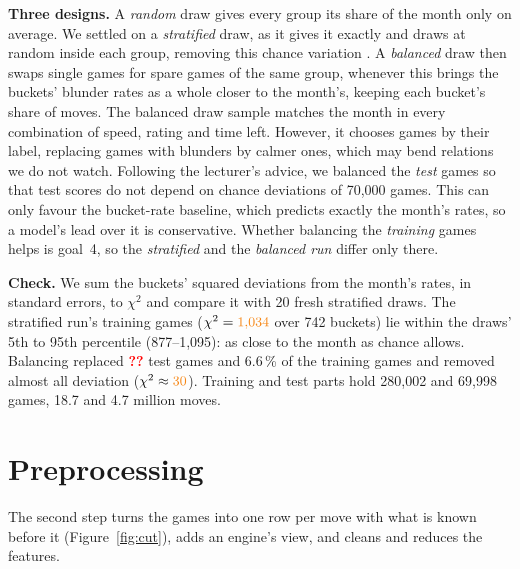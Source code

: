 \documentclass[a4paper,oneside,bibliography=totoc]{scrbook}
\newcommand{\tbd}{\textcolor{red}{\textbf{??}}}
\newcommand{\stale}[1]{\textcolor{BurntOrange}{#1}}
\begin{document}
\textbf{Three designs.} A \emph{random} draw gives every group its share of the month only on average. We settled on a
\emph{stratified} draw, as it gives it exactly and draws at random inside each group, removing this chance variation
\cite{cochran1977sampling}. A
\emph{balanced} draw then swaps single games for spare games of the same group, whenever this brings the buckets'
blunder rates as a whole closer to the month's, keeping each bucket's share of moves. The balanced draw sample matches the
month in every combination of speed, rating and time left. However, it chooses games by their label,
replacing games with blunders by calmer ones, which may bend relations we do not watch. Following the
lecturer's advice, we balanced the \emph{test} games so that test scores do not depend on chance deviations of
70,000 games. This can only favour the bucket-rate baseline, which predicts exactly the month's rates, so a
model's lead over it is conservative. Whether balancing the \emph{training} games helps is goal~4, so the
\emph{stratified} and the \emph{balanced run} differ only there.

\textbf{Check.} We sum the buckets' squared deviations from the month's rates, in standard errors, to $\chi^2$
and compare it with 20 fresh stratified draws. The stratified run's training games ($\chi^2 = \stale{1{,}034}$
over \stale{742} buckets) lie within the draws' 5th to 95th percentile (\stale{877--1,095}): as close to the
month as chance allows. Balancing replaced \tbd{} test games and \stale{6.6}\,\% of the training games and
removed almost all deviation ($\chi^2 \approx \stale{30}$). Training and test parts hold \stale{280,002} and
\stale{69,998} games, \stale{18.7} and \stale{4.7} million moves.

\chapter{Preprocessing}
\label{ch:preprocessing}

The second step turns the games into one row per move with what is known before it (Figure~\ref{fig:cut}),
adds an engine's view, and cleans and reduces the features.
\end{document}
